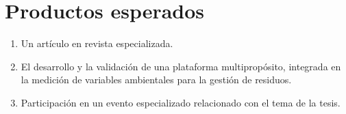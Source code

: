 \section{Productos esperados}

\begin{enumerate}[label=\Roman*.]
    \item Un artículo en revista especializada.
    \item El desarrollo y la validación de una plataforma multipropósito, integrada en la medición de variables ambientales para la gestión de residuos.
    \item Participación en un evento especializado relacionado con el tema de la tesis.
\end{enumerate}
